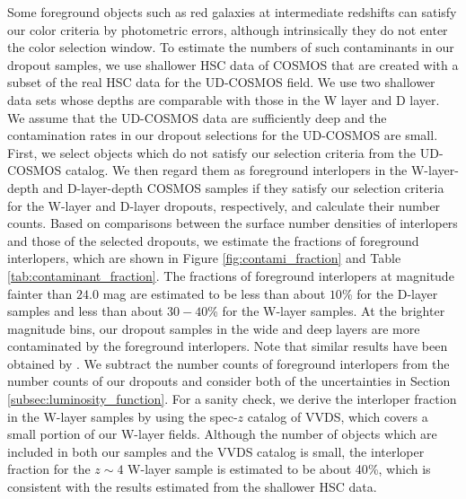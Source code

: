 \documentclass[]{pasj01}
\begin{document}
Some foreground objects such as red galaxies at intermediate redshifts  
can satisfy our color criteria by photometric errors, 
although intrinsically they do not enter the color selection window. 
To estimate the numbers of such contaminants in our dropout samples, 
we use shallower HSC data of COSMOS that are created 
with a subset of the real HSC data for the UD-COSMOS field. 
We use two shallower data sets 
whose depths are comparable with those in the W layer and D layer. 
We assume that 
the UD-COSMOS data are sufficiently deep 
and the contamination rates in our dropout selections for the UD-COSMOS are small. 
First, we select objects which 
do not satisfy our selection criteria from the UD-COSMOS catalog. 
%
We then regard them as foreground interlopers in the W-layer-depth and D-layer-depth COSMOS samples 
if they satisfy our selection criteria for the W-layer and D-layer dropouts, respectively,  
and calculate their number counts.  
Based on comparisons between the surface number densities of interlopers 
and those of the selected dropouts, 
we estimate 
the fractions of foreground interlopers, 
which are shown in Figure \ref{fig:contami_fraction} 
and Table \ref{tab:contaminant_fraction}. 
The fractions of foreground interlopers at magnitude fainter than $24.0$ mag 
are estimated to be 
less than about $10${\%} for the D-layer samples 
and 
less than about $30-40${\%} for the W-layer samples. 
%
At the brighter magnitude bins, 
our dropout samples in the wide and deep layers 
are more contaminated by the foreground interlopers. 
Note that similar results have been obtained by \citet{2008ApJS..175...48R}.
%
We subtract the number counts of foreground interlopers  
from the number counts of our dropouts 
and consider both of the uncertainties 
in Section \ref{subsec:luminosity_function}. 
For a sanity check, 
we derive the interloper fraction in the W-layer samples 
by using the spec-$z$ catalog of VVDS, 
which covers a small portion of our W-layer fields. 
Although the number of objects which are included 
in both our samples and the VVDS catalog is small, 
the interloper fraction for the $z \sim 4$ W-layer sample is estimated to be about 40{\%}, 
which is consistent with the results estimated from the shallower HSC data. 
\end{document}

